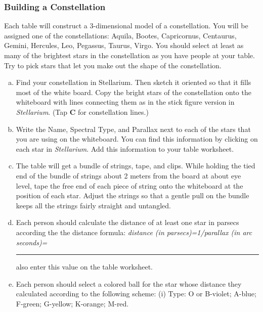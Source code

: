 \documentclass[main.tex]{subfiles}
\begin{document}
\subsubsection{Building a Constellation}
Each table will construct a 3-dimensional model of a constellation. You will be assigned one of the constellations: Aquila, Bootes, Capricornus, Centaurus, Gemini, Hercules, Leo, Pegassus, Taurus, Virgo. You should select at least as many of the brightest stars in the constellation as you have people at your table. Try to pick stars that let you make out the shape of the constellation. 
\begin{enumerate} [a.]
    \item Find your constellation in Stellarium. Then sketch it oriented so that it fills most of the white board. Copy the bright stars of the constellation onto the whiteboard with lines connecting them as in the stick figure version in \textit{Stellarium}. (Tap \textbf{C} for constellation lines.)
    \item Write the Name, Spectral Type, and Parallax next to each of the stars that you are using on the whiteboard. You can find this information by clicking on each star in \textit{Stellarium}. Add this information to your table worksheet. 
    \item The table will get a bundle of strings, tape, and clips. While holding the tied end of the bundle of strings about 2 meters from the board at about eye level, tape the free end of each piece of string onto the whiteboard at the position of each star. Adjust the strings so that a gentle pull on the bundle keeps all the strings fairly straight and untangled.
    \item Each person should calculate the distance of at least one star in parsecs according the the distance formula:
    \newline
    \newline
\textit{distance (in parsecs)=1/parallax (in arc seconds)=} \rule{2cm}{.15mm}
\newline
\newline
also enter this value on the table worksheet.
\item Each person should select a colored ball for the star whose distance they calculated according to the following scheme:
\newline
\newline
(i) Type: O or B-violet; A-blue; F-green; G-yellow; K-orange; M-red.
\newline
\newline

\end{enumerate}
\end{document}
